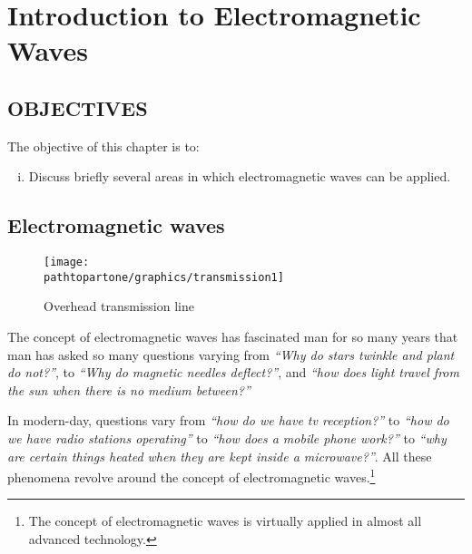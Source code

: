 \chapter{Introduction to Electromagnetic Waves}\label{lec:lec1}


\begin{mdframed}[backgroundcolor=lightblue, linewidth=1pt, hidealllines=true]
\section{OBJECTIVES}
The objective of this chapter is to:
\begin{enumerate}[(i)]
\item Discuss briefly several areas in which electromagnetic waves can be applied.
\end{enumerate}
\end{mdframed}

\section{Electromagnetic waves}

\begin{figure}[h]
\centering
\texttt{[image: \\pathtopartone/graphics/transmission1]}
\caption{Overhead transmission line}
\end{figure}

The concept of electromagnetic waves has fascinated man for so many years that man has asked so many questions varying from \emph{\textquotedblleft Why do stars twinkle and plant do not?\textquotedblright}, to \emph{\textquotedblleft Why do magnetic needles deflect?\textquotedblright}, and \emph{\textquotedblleft how does light travel from the sun when there is no medium between?\textquotedblright}

In modern-day, questions vary from \emph{\textquotedblleft how do we have tv reception?\textquotedblright} to \emph{\textquotedblleft how do we have radio stations operating\textquotedblright} to \emph{\textquotedblleft how does a mobile phone work?\textquotedblright} to \emph{\textquotedblleft why are certain things heated when they are kept inside a microwave?\textquotedblright}. All these phenomena revolve around the concept of electromagnetic waves.\footnote{The concept of electromagnetic waves is virtually applied in almost all advanced technology.}

